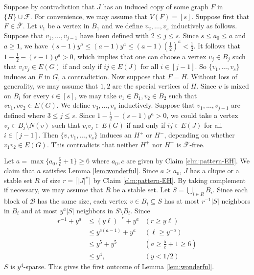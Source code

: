 \documentclass[a4paper,11pt]{article}
\let\oldendproof\endproof
\renewenvironment{proof}[1][\proofname]{%
	\oldproof[\normalfont\bfseries #1]%
}{\oldendproof}
\renewcommand{\qedsymbol}{$\square$}%
\newenvironment{subproof}[1][\normalfont\it Subproof]{%
	\renewcommand{\qedsymbol}{{\tiny{$\blacksquare$}}}%
	\begin{proof}[#1]%
	}{%
	\end{proof}%
}
\begin{document}
\begin{proof}
\begin{subproof}[Proof of Claim \ref{clm:pattern-EH}]
        Suppose by contradiction that $J$ has an induced copy of some graph $F$ in $\{H\}\cup \overline{\mathcal{F}}$. 
        For convenience, we may assume that $V(F)=[s]$.  
        Suppose first that $F\in \overline{\mathcal{F}}$.
        Let $v_1$ be a vertex in $B_1$ and
        we define $v_2,\ldots,v_s$ inductively as follows. 
        Suppose that $v_1,\ldots,v_{j-1}$ have been defined with $2\le j\leq s$. 
        Since $s\leq a_0\leq a$ and $a\geq 1$, we have $(s-1)y^a\leq (a-1)y^a\leq (a-1)(\frac{1}{2})^a<\frac{1}{2}$. 
        It follows that $1-\frac{1}{2}-(s-1)y^a>0$, which implies that one can choose a vertex $v_j\in B_j$ such that $v_iv_j\in E(G)$ if and only if $ij\in E(J)$ for all $i\in[j-1]$.
        So $\{v_1,\ldots,v_s\}$ induces an $F$ in $G$, a contradiction. 
        Now suppose that $F=H$. 
        Without loss of generality, we may assume that $1,2$ are the special vertices of $H$. 
        Since $v$ is mixed on $B_i$ for every $i\in [s]$, we may take $v_1\in B_1,v_2\in B_2$ such that $vv_1,vv_2\in E(G)$. 
        We define $v_3,\ldots,v_s$ inductively. 
        Suppose that $v_1,\ldots,v_{j-1}$ are defined where $3\le j\leq s$. 
        Since $1-\frac{1}{2}-(s-1)y^a>0$, we could take a vertex $v_j\in B_j\setminus N(v)$ such that $v_iv_j\in E(G)$ if and only if $ij\in E(J)$ for all $i\in [j-1]$. 
        Then $\{v,v_1,\ldots,v_s\}$ induces an $H^+$ or $H^-$, depending on whether $v_1v_2\in E(G)$. This contradicts that neither $H^+$ nor $H^-$ is $\overline{\mathcal{F}}$-free.
    \end{subproof}

    Let $a=\max\{a_0,\frac{5}{c}+1\}\geq 6$ where $a_0,c$ are given by Claim \ref{clm:pattern-EH}. 
    We claim that $a$ satisfies Lemma \ref{lem:wonderful}. 
    Since $a\geq a_0$, $J$ has a clique or a stable set $R$ of size $r=\lceil|J|^c\rceil$ by Claim \ref{clm:pattern-EH}.
    By taking complement if necessary, we may assume that $R$ be a stable set. Let $S=\bigcup_{i\in R}B_i$. Since each block of $\mathcal{B}$ has the same size, each vertex $v\in B_i\subseteq S$ has at most $r^{-1}|S|$ neighbors in $B_i$ and at most $y^a|S|$ neighbors in $S\setminus B_i$. Since 
    \begin{align*}
        r^{-1}+y^a & \leq (y\ell)^{-c}+y^a  & (r\ge y\ell)\\
                   &  \leq y^{c(a-1)}+y^a   & (\ell \geq y^{-a}) \\
                   &  \leq y^5+y^5          & (a\ge \frac{5}{c}+1\ge 6) \\
                   &   \leq y^4,            & (y<1/2)
    \end{align*}
    $S$ is $y^4$-sparse. This gives the first outcome of Lemma \ref{lem:wonderful}.
\end{proof}
\end{document}
